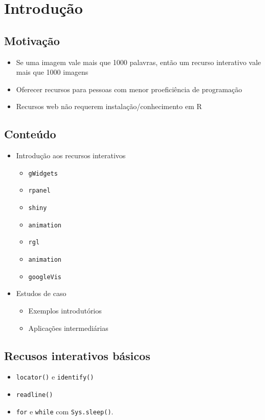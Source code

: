 \section{Introdução}

\subsection{Motivação}

\begin{frame}

  \begin{itemize}
  \item Se uma imagem vale mais que 1000 palavras, então um recurso
    interativo vale mais que 1000 imagens
  \item Oferecer recursos para pessoas com menor proeficiência de
    programação
  \item Recursos web não requerem instalação/conhecimento em R
  \end{itemize}

\end{frame}

\subsection{Conteúdo}

\begin{frame}

  \begin{itemize}
  \item Introdução aos recursos interativos
  
  \begin{itemize}
    \itemsep1pt\parskip0pt
  \item \texttt{gWidgets}
  \item \texttt{rpanel}
  \item \texttt{shiny}
  \item \texttt{animation}
  \item \texttt{rgl}
  \item \texttt{animation}
  \item \texttt{googleVis}
  \end{itemize}
\item Estudos de caso

  \begin{itemize}
  \item Exemplos introdutórios
  \item Aplicações intermediárias
  \end{itemize}
\end{itemize}

\end{frame}

\subsection{Recusos interativos básicos}

\begin{frame}

  \begin{itemize}
  \item \texttt{locator()} e \texttt{identify()}
  \item \texttt{readline()}
  \item \texttt{for} e \texttt{while} com \texttt{Sys.sleep()}.
  \end{itemize}

\end{frame}